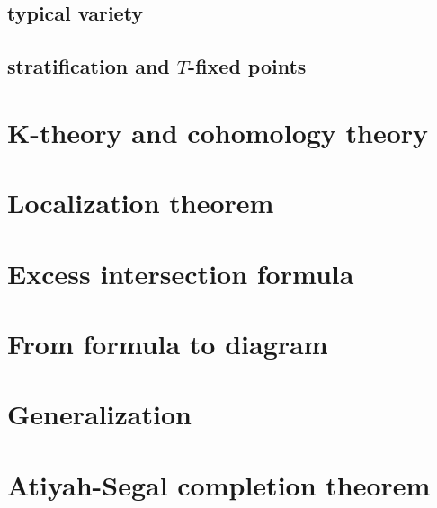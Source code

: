 \documentclass[reqno,11pt]{book}
\numberwithin{equation}{section}
\theoremstyle{plain}
\theoremstyle{plain}
\numberwithin{equation}{section}
\theoremstyle{remark}
\begin{document}
\section{typical variety}
\section{stratification and $T$-fixed points}
\chapter{K-theory and cohomology theory}
\chapter{Localization theorem}

\chapter{Excess intersection formula}

\chapter{From formula to diagram}


\chapter{Generalization}

\chapter{Atiyah-Segal completion theorem}


%
%
\end{document}
